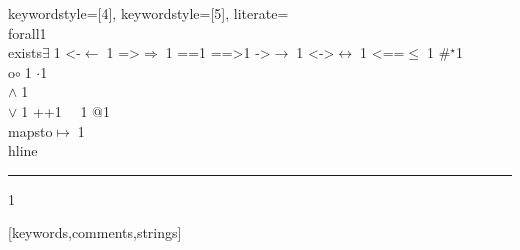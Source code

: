 {    keywordstyle=[4]{\ttfamily\color{dkblue}},
    keywordstyle=[5]{\ttfamily\color{dkred}},
    literate=
    {\\forall}{{\color{dkgreen}{$\forall\;$}}}1
    {\\exists}{{$\exists\;$}}1
    {<-}{{$\leftarrow\;$}}1
    {=>}{{$\Rightarrow\;$}}1
    {==}{{\code{==}\;}}1
    {==>}{{\code{==>}\;}}1
    {->}{{$\rightarrow\;$}}1
    {<->}{{$\leftrightarrow\;$}}1
    {<==}{{$\leq\;$}}1
    {\#}{{$^\star$}}1 
    {\\o}{{$\circ\;$}}1 
    {\@}{{$\cdot$}}1 
    {\/\\}{{$\wedge\;$}}1
    {\\\/}{{$\vee\;$}}1
    {++}{{\code{++}}}1
    {~}{{\ }}1
    {\@\@}{{$@$}}1
    {\\mapsto}{{$\mapsto\;$}}1
    {\\hline}{{\rule{\linewidth}{0.5pt}}}1
}[keywords,comments,strings]


\usepackage{ebproof}


\usepackage[breakable]{tcolorbox} %
\DeclareRobustCommand\titleforcurrentframe{temp}  %
\newcommand{\mybox}[1]{%
    \begin{tcolorbox}[
        colframe=augustablue,
        colback=white,
        width={\dimexpr\textwidth},
        breakable,
        adjusted title={\hypersetup{citecolor=white}\titleforcurrentframe}
    ]
    #1
    \end{tcolorbox}
}


\usepackage{pdfpages}
\newcommand*{\numberofpages}[1]{%
    \the\XeTeXpdfpagecount"#1" %
}

